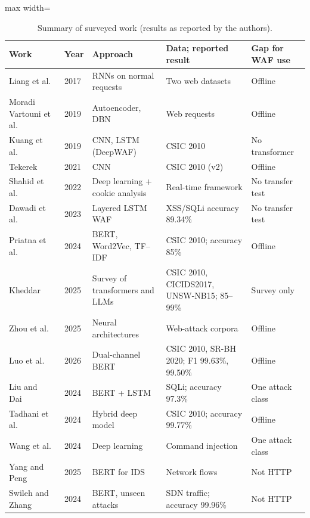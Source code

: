 \documentclass[preprint,11pt]{elsarticle}
\let\footnotesize\normalsize
\begin{document}
\begin{table}[t]
\centering
\caption{Summary of surveyed work (results as reported by the authors).}
\label{tab:survey}
\footnotesize
\begin{adjustbox}{max width=\textwidth}
\begin{tabular}{@{}p{3.4cm}p{0.8cm}p{3.4cm}p{4.6cm}p{3.0cm}@{}}
\toprule
Work & Year & Approach & Data; reported result & Gap for WAF use \\
\midrule
Liang et al.~\cite{liang2017rnn} & 2017 & RNNs on normal requests & Two web datasets & Offline \\
Moradi Vartouni et al.~\cite{vartouni2019deepwaf} & 2019 & Autoencoder, DBN & Web requests & Offline \\
Kuang et al.~\cite{kuang2019deepwaf} & 2019 & CNN, LSTM (DeepWAF) & CSIC 2010 & No transformer \\
Tekerek~\cite{tekerek2021cnn} & 2021 & CNN & CSIC 2010 (v2) & Offline \\
Shahid et al.~\cite{shahid2022framework} & 2022 & Deep learning + cookie analysis & Real-time framework & No transfer test \\
Dawadi et al.~\cite{dawadi2023lstmwaf} & 2023 & Layered LSTM WAF & XSS/SQLi accuracy 89.34\% & No transfer test \\
Priatna et al.~\cite{priatna2024transformer} & 2024 & BERT, Word2Vec, TF--IDF & CSIC 2010; accuracy 85\% & Offline \\
Kheddar~\cite{kheddar2025survey} & 2025 & Survey of transformers and LLMs & CSIC 2010, CICIDS2017, UNSW-NB15; 85--99\% & Survey only \\
Zhou et al.~\cite{zhou2025ewebguard} & 2025 & Neural architectures & Web-attack corpora & Offline \\
Luo et al.~\cite{wadbert2026} & 2026 & Dual-channel BERT & CSIC 2010, SR-BH 2020; F1 99.63\%, 99.50\% & Offline \\
Liu and Dai~\cite{liu2024bertlstm} & 2024 & BERT + LSTM & SQLi; accuracy 97.3\% & One attack class \\
Tadhani et al.~\cite{scireports2024novelxsssqli} & 2024 & Hybrid deep model & CSIC 2010; accuracy 99.77\% & Offline \\
Wang et al.~\cite{scireports2024cmdi} & 2024 & Deep learning & Command injection & One attack class \\
Yang and Peng~\cite{yang2025bertids} & 2025 & BERT for IDS & Network flows & Not HTTP \\
Swileh and Zhang~\cite{sdnbert2024} & 2024 & BERT, unseen attacks & SDN traffic; accuracy 99.96\% & Not HTTP \\

\end{tabular}
\end{adjustbox}
\end{table}
\end{document}
